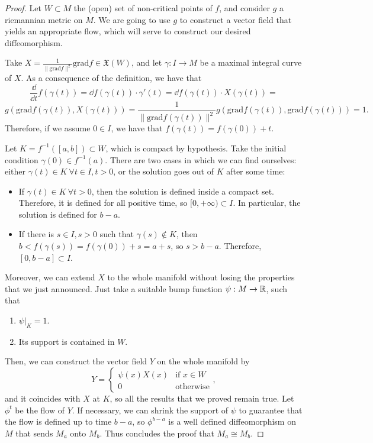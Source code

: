 \begin{proof}
Let $W \subset M$ the (open) set of non-critical points of $f$, and consider $g$ a riemannian metric on $M$. We are going to use $g$ to construct a vector field that yields an appropriate flow, which will serve to construct our desired diffeomorphism.

Take $X = \frac1{\|\text{grad}f\|^2}\text{grad}f \in \mathfrak{X}(W)$, and let $\gamma : I \rightarrow M$ be a maximal integral curve of $X$. As a consequence of the definition, we have that
$$\frac{\dd}{\dd t} f(\gamma(t)) = \dd f(\gamma(t)) \cdot \gamma'(t) = \dd f(\gamma(t)) \cdot X(\gamma(t)) =$$
$$g\left(\text{grad}f(\gamma(t)),X(\gamma(t))\right) = \frac1{\|\text{grad} f(\gamma(t))\|^2} g(\text{grad} f(\gamma(t)),\text{grad} f(\gamma(t))) = 1 .$$
Therefore, if we assume $0 \in I$, we have that $f(\gamma(t)) = f(\gamma(0)) + t$.

Let $K = f^{-1}([a,b]) \subset W$, which is compact by hypothesis. Take the initial condition $\gamma(0) \in f^{-1}(a)$. There are two cases in which we can find ourselves: either $\gamma(t) \in K \ \forall t \in I, t > 0$, or the solution goes out of $K$ after some time:

\begin{itemize}
	\item If $\gamma(t) \in K \ \forall t > 0$, then the solution is defined inside a compact set. Therefore, it is defined for all positive time, so $[0,+\infty) \subset I$. In particular, the solution is defined for $b-a$.
	\item If there is $s \in I, s > 0$ such that $\gamma(s) \notin K$, then $b < f(\gamma(s)) = f(\gamma(0)) + s = a+s$, so $s > b-a$. Therefore, $[0,b-a] \subset I$.
\end{itemize}

Moreover, we can extend $X$ to the whole manifold without losing the properties that we just announced. Just take a suitable bump function $\psi : M \rightarrow \mathbb{R}$, such that

\begin{enumerate}
	\item $\left. \psi \right|_K = 1$.
	\item Its support is contained in $W$.
\end{enumerate}

Then, we can construct the vector field $Y$ on the whole manifold by
$$Y = \left\{ \begin{array}{ll} \psi(x) X(x) & \text{if } x \in W \\ 0 & \text{otherwise} \end{array} \right. ,$$
and it coincides with $X$ at $K$, so all the results that we proved remain true. Let $\phi^t$ be the flow of $Y$. If necessary, we can shrink the support of $\psi$ to guarantee that the flow is defined up to time $b-a$, so $\phi^{b-a}$ is a well defined diffeomorphism on $M$ that sends $M_a$ onto $M_b$. Thus concludes the proof that $M_a \cong M_b$.


\end{proof}
